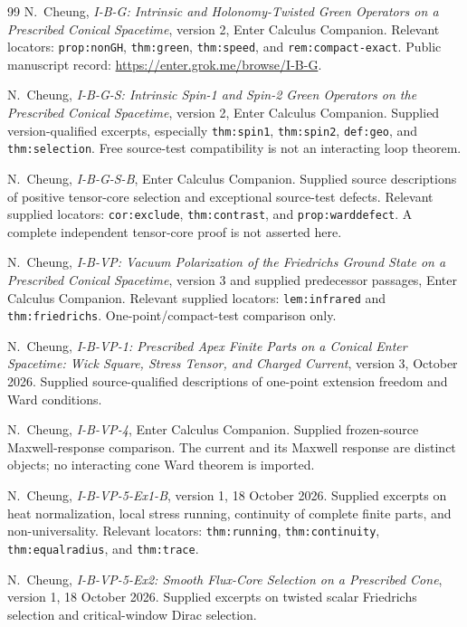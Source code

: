 \documentclass[11pt,a4paper]{article}
\newcommand{\loc}[1]{\nolinkurl{#1}}
\theoremstyle{plain}
\theoremstyle{definition}
\theoremstyle{remark}
\numberwithin{equation}{section}
\begin{document}
\begin{thebibliography}{99}
\ddag N.~Cheung,
\emph{I-B-G: Intrinsic and Holonomy-Twisted Green Operators on a
Prescribed Conical Spacetime},
version 2, Enter Calculus Companion.
Relevant locators:
\loc{prop:nonGH}, \loc{thm:green}, \loc{thm:speed},
and \loc{rem:compact-exact}.
Public manuscript record:
\url{https://enter.grok.me/browse/I-B-G}.

\ddag N.~Cheung,
\emph{I-B-G-S: Intrinsic Spin-1 and Spin-2 Green Operators on the
Prescribed Conical Spacetime},
version 2, Enter Calculus Companion.
Supplied version-qualified excerpts, especially
\loc{thm:spin1}, \loc{thm:spin2},
\loc{def:geo}, and \loc{thm:selection}.
Free source-test compatibility is not an interacting loop theorem.

\ddag N.~Cheung,
\emph{I-B-G-S-B},
Enter Calculus Companion.
Supplied source descriptions of positive tensor-core selection
and exceptional source-test defects.
Relevant supplied locators:
\loc{cor:exclude}, \loc{thm:contrast}, and
\loc{prop:warddefect}.
A complete independent tensor-core proof is not asserted here.

\ddag N.~Cheung,
\emph{I-B-VP: Vacuum Polarization of the Friedrichs Ground State
on a Prescribed Conical Spacetime},
version 3 and supplied predecessor passages,
Enter Calculus Companion.
Relevant supplied locators:
\loc{lem:infrared} and \loc{thm:friedrichs}.
One-point/compact-test comparison only.

\ddag N.~Cheung,
\emph{I-B-VP-1: Prescribed Apex Finite Parts on a Conical Enter
Spacetime: Wick Square, Stress Tensor, and Charged Current},
version 3, October 2026.
Supplied source-qualified descriptions of one-point extension
freedom and Ward conditions.

\ddag N.~Cheung,
\emph{I-B-VP-4},
Enter Calculus Companion.
Supplied frozen-source Maxwell-response comparison.
The current and its Maxwell response are distinct objects;
no interacting cone Ward theorem is imported.

\ddag N.~Cheung,
\emph{I-B-VP-5-Ex1-B},
version 1, 18 October 2026.
Supplied excerpts on heat normalization, local stress running,
continuity of complete finite parts, and non-universality.
Relevant locators:
\loc{thm:running}, \loc{thm:continuity},
\loc{thm:equalradius}, and \loc{thm:trace}.

\ddag N.~Cheung,
\emph{I-B-VP-5-Ex2: Smooth Flux-Core Selection on a Prescribed Cone},
version 1, 18 October 2026.
Supplied excerpts on twisted scalar Friedrichs selection and
critical-window Dirac selection.


\end{thebibliography}
\end{document}
